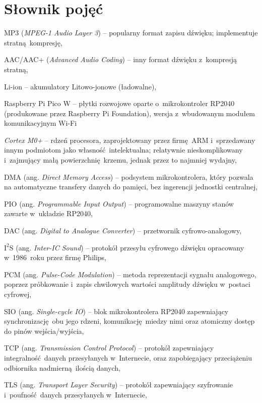 \documentclass[polish]{aghengthesis}
\let\tempone\itemize
\let\temptwo\enditemize
\renewenvironment{itemize}{\tempone\setlength{\itemsep}{0cm}}{\temptwo}
\newcommand{\isqs}{$\text{I}^{2}\text{S}$}
\begin{document}
	\section{Słownik pojęć}
	\begin{itemize}
		\setlength{\itemsep}{0.1cm}
		\item MP3 (\textit{MPEG-1 Audio Layer 3}) -- popularny format zapisu dźwięku; implementuje stratną kompresję,
		\item AAC/AAC+ (\textit{Advanced Audio Coding}) -- inny format dźwięku z~kompresją stratną,
		\item Li-ion -- akumulatory Litowo-jonowe (ładowalne),
		\item Raspberry Pi Pico W -- płytki rozwojowe oparte o~mikrokontroler RP2040 (produkowane przez Raspberry Pi Foundation), wersja z~wbudowanym modułem komunikacyjnym Wi-Fi
		\item \textit{Cortex M0+} -- rdzeń procesora, zaprojektowany przez firmę ARM i~sprzedawany innym podmiotom jako własność intelektualna; relatywnie nieskomplikowany i~zajmujący małą powierzchnię krzemu, jednak przez to najmniej wydajny,
		\item DMA (ang. \textit{Direct Memory Access}) -- podsystem mikrokontrolera, który pozwala na automatyczne transfery danych do pamięci, bez ingerencji jednostki centralnej,
		\item PIO (ang. \textit{Programmable Input Output}) -- programowalne maszyny stanów zawarte w~układzie RP2040,
		\item DAC (ang. \textit{Digital to Analogue Converter}) -- przetwornik cyfrowo-analogowy,
		\item \isqs{} (ang. \textit{Inter-IC Sound}) -- protokół przesyłu cyfrowego dźwięku opracowany w~1986~roku przez firmę Philips,
		\item PCM (ang. \textit{Pulse-Code Modulation}) -- metoda reprezentacji sygnału analogowego, poprzez próbkowanie i~zapis chwilowych wartości amplitudy dźwięku w~postaci cyfrowej,
		\item SIO (ang. \textit{Single-cycle IO}) -- blok mikrokontrolera RP2040 zapewniający synchronizację obu jego rdzeni, komunikację miedzy nimi oraz atomiczny dostęp do pinów wejścia/wyjścia,
		\item TCP (ang. \textit{Transmission Control Protocol}) -- protokół zapewniający integralność danych przesyłanych w~Internecie, oraz zapobiegający przeciążeniu odbiornika nadmierną ilością danych,
		\item TLS (ang. \textit{Transport Layer Security}) -- protokół zapewniający szyfrowanie i~poufność danych przesyłanych w~Internecie,
	\end{itemize}
\end{document}
